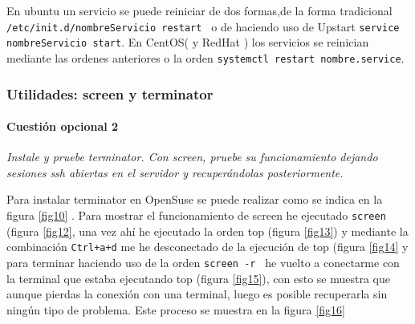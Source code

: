 En ubuntu un servicio se puede reiniciar de dos formas,de la forma tradicional \newline
 \texttt{ /etc/init.d/nombreServicio restart } o de haciendo uso de  Upstart \newline
 \texttt{service nombreServicio start}. \cite{rest1} En CentOS( y RedHat ) los servicios se reinician mediante las ordenes anteriores o la orden
 \texttt{systemctl restart nombre.service}. \cite{rest2}






\subsubsection{Utilidades: screen y terminator}
\paragraph{Cuestión opcional 2}
\textit{Instale y pruebe terminator. Con screen, pruebe su funcionamiento dejando sesiones ssh abiertas en el servidor y recuperándolas posteriormente.}
\newline

Para instalar terminator en OpenSuse se puede realizar como se indica en la figura \ref{fig10} . Para mostrar el funcionamiento de screen he ejecutado \texttt{screen} (figura \ref{fig12}, una vez ahí he ejecutado la orden top (figura \ref{fig13}) y mediante la combinación \texttt{Ctrl+a+d} me he desconectado de la ejecución de top (figura \ref{fig14} y para terminar haciendo uso de la orden \texttt{screen -r } he vuelto a conectarme con la terminal que estaba ejecutando top (figura \ref{fig15}), con esto se muestra que aunque pierdas la conexión con una terminal, luego es posible recuperarla sin ningún tipo de problema. Este proceso se muestra en la figura \ref{fig16}


